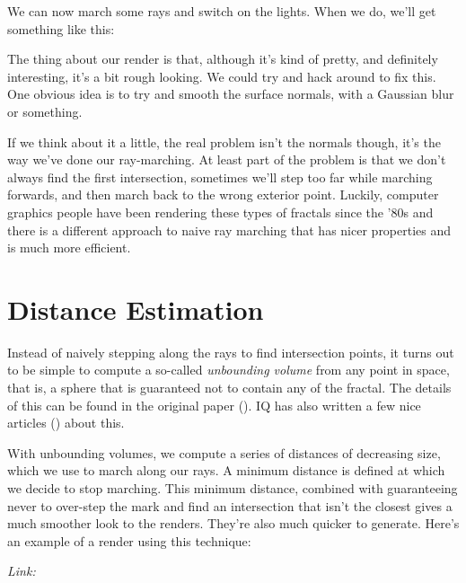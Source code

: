 \documentclass[11pt]{article}
\begin{document}
We can now march some rays and switch on the lights. When we do, we'll get something like this:

The thing about our render is that, although it's kind of pretty, and definitely interesting, it's a bit rough looking. We could try and hack around to fix this. One obvious idea is to try and smooth the surface normals, with a Gaussian blur or something. 

If we think about it a little, the real problem isn't the normals though, it's the way we've done our ray-marching. At least part of the problem is that we don't always find the first intersection, sometimes we'll step too far while marching forwards, and then march back to the wrong exterior point. Luckily, computer graphics people have been rendering these types of fractals since the '80s and there is a different approach to naive ray marching that has nicer properties and is much more efficient. 

\section{Distance Estimation}

Instead of naively stepping along the rays to find intersection points, it turns out to be simple to compute a so-called \emph{unbounding volume} from any point in space, that is, a sphere that is guaranteed not to contain any of the fractal. The details of this can be found in the original paper (\texttt{}). IQ has also written a few nice articles (\texttt{}) about this.

With unbounding volumes, we compute a series of distances of decreasing size, which we use to march along our rays. A minimum distance is defined at which we decide to stop marching. This minimum distance, combined with guaranteeing never to over-step the mark and find an intersection that isn't the closest gives a much smoother look to the renders. They're also much quicker to generate. Here's an example of a render using this technique:

\begin{center}\end{center}

\textit{Link: }\texttt{}
\end{document}
